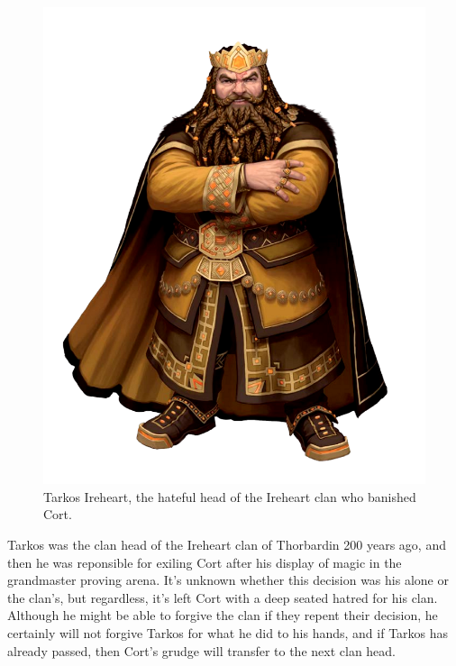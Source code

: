 \documentclass[12pt]{article}
\begin{document}
\begin{figure}[!htb]
  \centering
  \includegraphics[width=.6\textwidth]{./resources/tarkos}
  \caption{Tarkos Ireheart, the hateful head of the Ireheart clan who banished
  Cort.}
\end{figure}

Tarkos was the clan head of the Ireheart clan of Thorbardin 200 years ago, and
then he was reponsible for exiling Cort after his display of magic in the
grandmaster proving arena. It's unknown whether this decision was his alone or
the clan's, but regardless, it's left Cort with a deep seated hatred for his
clan. Although he might be able to forgive the clan if they repent their
decision, he certainly will not forgive Tarkos for what he did to his hands, and
if Tarkos has already passed, then Cort's grudge will transfer to the next clan
head.
\end{document}
